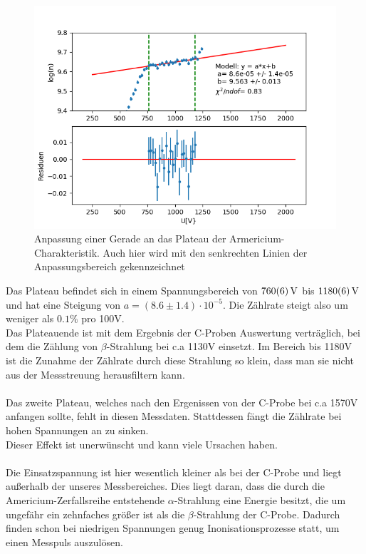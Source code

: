 \documentclass[12pt,a4paper]{article}
\begin{document}
\begin{figure}
\centering
\includegraphics[scale=0.8]{Bilder/Prop/Am_plateau.PNG}
\caption{Anpassung einer Gerade an das Plateau der Armericium-Charakteristik. Auch hier wird mit den senkrechten Linien der Anpassungsbereich gekennzeichnet}
\label{fig:AMPlateau}
\end{figure}

Das Plateau befindet sich in einem Spannungsbereich von $\SI{760\pm 6}{V}$ bis $\SI{1180\pm 6}{V}$ und hat eine Steigung von $a = (8.6\pm1.4)\cdot 10^{-5}$. Die Zählrate steigt also um weniger als $0.1\%$ pro 100V.\\
 Das Plateauende ist mit dem Ergebnis der C-Proben Auswertung verträglich, bei dem die Zählung von $\beta$-Strahlung bei c.a 1130V einsetzt. Im Bereich bis 1180V ist die Zunahme der Zählrate durch diese Strahlung so klein, dass man sie nicht aus der Messstreuung herausfiltern kann.\\
\\
Das zweite Plateau, welches nach den Ergenissen von der C-Probe bei c.a 1570V anfangen sollte, fehlt in diesen Messdaten. Stattdessen fängt die Zählrate bei hohen Spannungen an zu sinken. \\
Dieser Effekt ist unerwünscht und kann viele Ursachen haben.\\
\\
Die Einsatzspannung ist hier wesentlich kleiner als bei der C-Probe und liegt außerhalb der unseres Messbereiches. Dies liegt daran, dass die durch die Americium-Zerfallsreihe entstehende $\alpha$-Strahlung eine Energie besitzt, die 
um ungefähr ein zehnfaches größer ist als die $\beta$-Strahlung der C-Probe. Dadurch finden schon bei niedrigen Spannungen genug Inonisationsprozesse statt, um einen Messpuls auszulösen.\\
\end{document}
